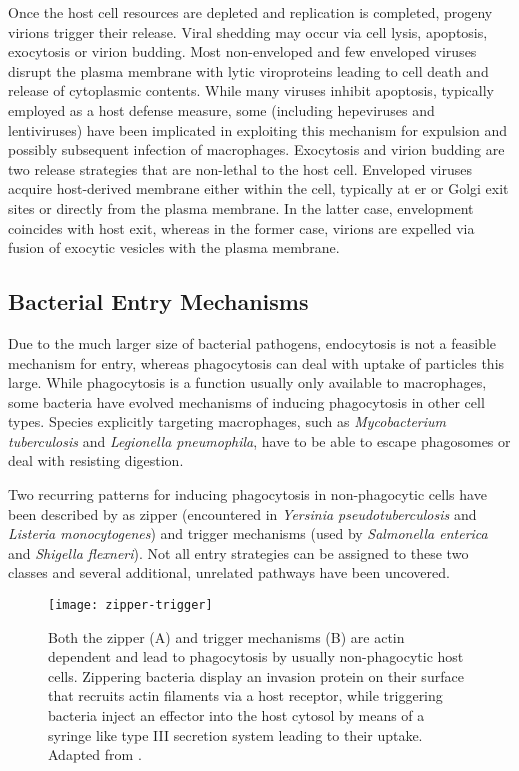 Once the host cell resources are depleted and replication is completed, progeny virions trigger their release. Viral shedding may occur via cell lysis, apoptosis, exocytosis or virion budding. Most non-enveloped and few enveloped viruses disrupt the plasma membrane with lytic viroproteins leading to cell death and release of cytoplasmic contents. While many viruses inhibit  apoptosis, typically employed as a host defense measure, some (including hepeviruses and lentiviruses) have been implicated in exploiting this mechanism for expulsion and possibly subsequent infection of macrophages. Exocytosis and virion budding are two release strategies that are non-lethal to the host cell. Enveloped viruses acquire host-derived membrane either within the cell, typically at \gls{er} or Golgi exit sites or directly from the plasma membrane. In the latter case, envelopment coincides with host exit, whereas in the former case, virions are expelled via fusion of exocytic vesicles with the plasma membrane.

\subsection{Bacterial Entry Mechanisms}

Due to the much larger size of bacterial pathogens, endocytosis is not a feasible mechanism for entry, whereas phagocytosis can deal with uptake of particles this large. While phagocytosis is a function usually only available to macrophages, some bacteria have evolved mechanisms of inducing phagocytosis in other cell types. Species explicitly targeting macrophages, such as \textit{Mycobacterium tuberculosis} and \textit{Legionella pneumophila}, have to be able to escape phagosomes or deal with resisting digestion.

Two recurring patterns for inducing phagocytosis in non-phagocytic cells have been described by \cite{Cossart2004} as zipper (encountered in \textit{Yersinia pseudotuberculosis} and \textit{Listeria monocytogenes}) and trigger mechanisms (used by \textit{Salmonella enterica} and \textit{Shigella flexneri}). Not all entry strategies can be assigned to these two classes and several additional, unrelated pathways have been uncovered.

\begin{figure}
  \centering
  \texttt{[image: zipper-trigger]}
  \caption[Zipper and trigger mechanisms for bacterial host-cell entry]{Both the zipper (A) and trigger mechanisms (B) are actin dependent and lead to phagocytosis by usually non-phagocytic host cells. Zippering bacteria display an invasion protein on their surface that recruits actin filaments via a host receptor, while triggering bacteria inject an effector into the host cytosol by means of a syringe like type III secretion system leading to their uptake. Adapted from \cite{Haglund2011}.}
  \label{fig:zipper-trigger}
\end{figure}


